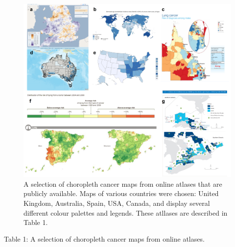 \documentclass{monashthesis}
\begin{document}
\begin{figure}

{\centering \includegraphics[width=50in]{figures/02-literature/choropleth_grid} 

}

\caption{ A selection of choropleth cancer maps from online atlases that are publicly available. Maps of various countries were chosen: United Kingdom, Australia, Spain, USA, Canada, and display several different colour palettes and legends. These atllases are described in Table 1.}\label{fig:choropleth-grid-create}
\end{figure}

\newpage

Table 1: A selection of choropleth cancer maps from online atlases.
\end{document}
